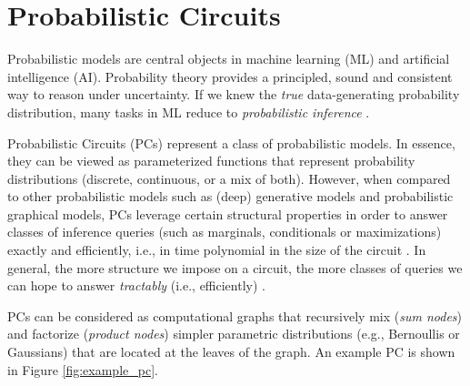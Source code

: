 
\section{Probabilistic Circuits}
Probabilistic models are central objects in machine learning (ML) and artificial intelligence (AI). Probability theory provides a principled, sound and consistent way to reason under uncertainty. If we knew the \textit{true} data-generating probability distribution, many tasks in ML reduce to \textit{probabilistic inference} \cite{pc_intro}.

Probabilistic Circuits (PCs) represent a class of probabilistic models. In essence, they can be viewed as parameterized functions that represent probability distributions (discrete, continuous, or a mix of both). However, when compared to other probabilistic models such as (deep) generative models and probabilistic graphical models, PCs leverage certain structural properties in order to answer classes of inference queries (such as marginals, conditionals or maximizations) exactly and efficiently, i.e., in time polynomial in the size of the circuit \cite{pc_intro}. 
In general, the more structure we impose on a circuit, the more classes of queries we can hope to answer \emph{tractably} (i.e., efficiently) \cite{compositional_atlas}.

PCs can be considered as computational graphs that recursively mix (\textit{sum nodes}) and factorize (\textit{product nodes}) simpler parametric distributions (e.g., Bernoullis or Gaussians) that are located at the leaves of the graph. An example PC is shown in Figure \ref{fig:example_pc}.


